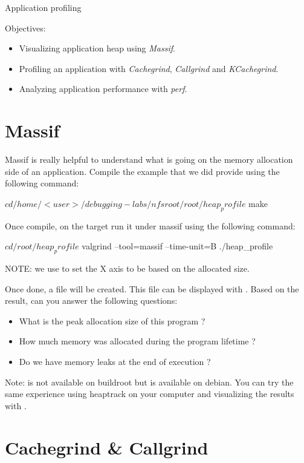 \subchapter
{Application profiling}
{Objectives:
  \begin{itemize}
    \item Visualizing application heap using {\em Massif}.
    \item Profiling an application with {\em Cachegrind}, {\em Callgrind} and
          {\em KCachegrind}.
    \item Analyzing application performance with {\em perf}.
  \end{itemize}
}

\section{Massif}

Massif is really helpful to understand what is going on the memory allocation
side of an application. Compile the  example that we did provide
using the following command:

\begin{bashinput}
$ cd /home/<user>/debugging-labs/nfsroot/root/heap_profile
$ make
\end{bashinput}

Once compile, on the target run it under massif using the following command:

\begin{bashinput}
$ cd /root/heap_profile
$ valgrind --tool=massif --time-unit=B ./heap_profile
\end{bashinput}

NOTE: we use  to set the X axis to be based on the allocated
size.

Once done, a  file will be created. This file can be
displayed with . Based on the result, can you answer the
following questions:
\begin{itemize}
  \item What is the peak allocation size of this program ?
  \item How much memory was allocated during the program lifetime ?
  \item Do we have memory leaks at the end of execution ?
\end{itemize}

Note:  is not available on buildroot but is available on debian.
You can try the same experience using heaptrack on your computer and visualizing
the results with .

\section{Cachegrind \& Callgrind}

